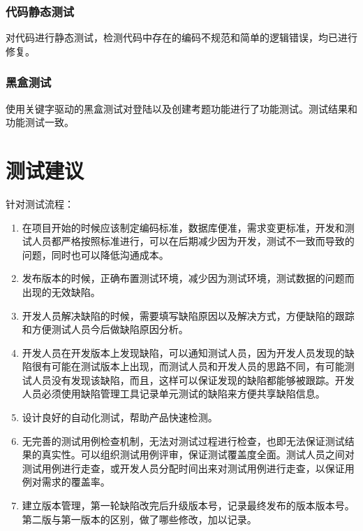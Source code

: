 \documentclass[hyperref, a4paper]{ctexart}
\begin{document}
\hypertarget{ux4ee3ux7801ux9759ux6001ux6d4bux8bd5}{%
\subsubsection{代码静态测试}\label{ux4ee3ux7801ux9759ux6001ux6d4bux8bd5}}

对代码进行静态测试，检测代码中存在的编码不规范和简单的逻辑错误，均已进行修复。

\hypertarget{ux9ed1ux76d2ux6d4bux8bd5-1}{%
\subsubsection{黑盒测试}\label{ux9ed1ux76d2ux6d4bux8bd5-1}}

使用关键字驱动的黑盒测试对登陆以及创建考题功能进行了功能测试。测试结果和功能测试一致。

\hypertarget{ux6d4bux8bd5ux5efaux8bae}{%
\section{测试建议}\label{ux6d4bux8bd5ux5efaux8bae}}

针对测试流程：

\begin{enumerate}
\def\labelenumi{\arabic{enumi}.}
\item
  在项目开始的时候应该制定编码标准，数据库便准，需求变更标准，开发和测试人员都严格按照标准进行，可以在后期减少因为开发，测试不一致而导致的问题，同时也可以降低沟通成本。
\item
  发布版本的时候，正确布置测试环境，减少因为测试环境，测试数据的问题而出现的无效缺陷。
\item
  开发人员解决缺陷的时候，需要填写缺陷原因以及解决方式，方便缺陷的跟踪和方便测试人员今后做缺陷原因分析。
\item
  开发人员在开发版本上发现缺陷，可以通知测试人员，因为开发人员发现的缺陷很有可能在测试版本上出现，而测试人员和开发人员的思路不同，有可能测试人员没有发现该缺陷，而且，这样可以保证发现的缺陷都能够被跟踪。开发人员必须使用缺陷管理工具记录单元测试的缺陷来方便共享缺陷信息。
\item
  设计良好的自动化测试，帮助产品快速检测。
\item
  无完善的测试用例检查机制，无法对测试过程进行检查，也即无法保证测试结果的真实性。可以组织测试用例评审，保证测试覆盖度全面。测试人员之间对测试用例进行走查，或开发人员分配时间出来对测试用例进行走查，以保证用例对需求的覆盖率。
\item
  建立版本管理，第一轮缺陷改完后升级版本号，记录最终发布的版本版本号。第二版与第一版本的区别，做了哪些修改，加以记录。
\end{enumerate}
\end{document}
